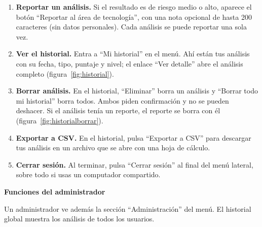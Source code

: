 \documentclass[journal,onecolumn,12pt,draftclsnofoot]{IEEEtran}
\newcommand{\apartado}[1]{\par\medskip\noindent\textbf{#1}\par\smallskip}
\begin{document}
\begin{enumerate}
  \item \textbf{Reportar un análisis.} Si el resultado es de riesgo medio o alto, aparece el botón ``Reportar al área de tecnología'', con una nota opcional de hasta 200 caracteres (sin datos personales). Cada análisis se puede reportar una sola vez.
  \item \textbf{Ver el historial.} Entra a ``Mi historial'' en el menú. Ahí están tus análisis con su fecha, tipo, puntaje y nivel; el enlace ``Ver detalle'' abre el análisis completo (figura~\ref{fig:historial}).
  \item \textbf{Borrar análisis.} En el historial, ``Eliminar'' borra un análisis y ``Borrar todo mi historial'' borra todos. Ambos piden confirmación y no se pueden deshacer. Si el análisis tenía un reporte, el reporte se borra con él (figura~\ref{fig:historialborrar}).
  \item \textbf{Exportar a CSV.} En el historial, pulsa ``Exportar a CSV'' para descargar tus análisis en un archivo que se abre con una hoja de cálculo.
  \item \textbf{Cerrar sesión.} Al terminar, pulsa ``Cerrar sesión'' al final del menú lateral, sobre todo si usas un computador compartido.
\end{enumerate}

\apartado{Funciones del administrador}

Un administrador ve además la sección ``Administración'' del menú. El historial global muestra los análisis de todos los usuarios.
\end{document}
